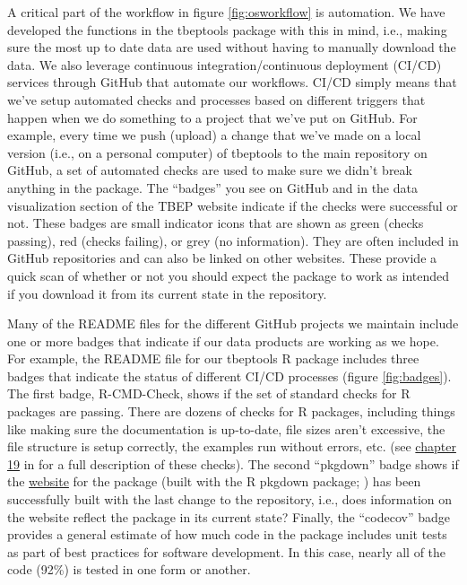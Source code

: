 \documentclass[
]{book}
\begin{document}
A critical part of the workflow in figure \ref{fig:osworkflow} is automation. We have developed the functions in the tbeptools package with this in mind, i.e., making sure the most up to date data are used without having to manually download the data. We also leverage continuous integration/continuous deployment (CI/CD) services through GitHub that automate our workflows. CI/CD simply means that we've setup automated checks and processes based on different triggers that happen when we do something to a project that we've put on GitHub. For example, every time we push (upload) a change that we've made on a local version (i.e., on a personal computer) of tbeptools to the main repository on GitHub, a set of automated checks are used to make sure we didn't break anything in the package. The ``badges'' you see on GitHub and in the data visualization section of the TBEP website indicate if the checks were successful or not. These badges are small indicator icons that are shown as green (checks passing), red (checks failing), or grey (no information). They are often included in GitHub repositories and can also be linked on other websites. These provide a quick scan of whether or not you should expect the package to work as intended if you download it from its current state in the repository.

Many of the README files for the different GitHub projects we maintain include one or more badges that indicate if our data products are working as we hope. For example, the README file for our tbeptools R package includes three badges that indicate the status of different CI/CD processes (figure \ref{fig:badges}). The first badge, R-CMD-Check, shows if the set of standard checks for R packages are passing. There are dozens of checks for R packages, including things like making sure the documentation is up-to-date, file sizes aren't excessive, the file structure is setup correctly, the examples run without errors, etc. (see \href{https://r-pkgs.org/r-cmd-check.html}{chapter 19} in \citet{Wickham15} for a full description of these checks). The second ``pkgdown'' badge shows if the \href{https://tbep-tech.github.io/tbeptools/}{website} for the package (built with the R pkgdown package; \citet{Wickham20}) has been successfully built with the last change to the repository, i.e., does information on the website reflect the package in its current state? Finally, the ``codecov'' badge provides a general estimate of how much code in the package includes unit tests as part of best practices for software development. In this case, nearly all of the code (92\%) is tested in one form or another.
\end{document}
